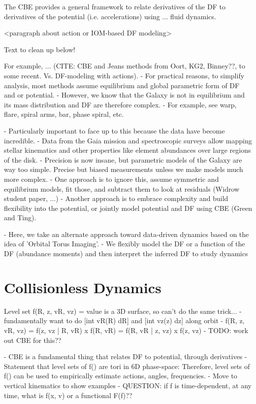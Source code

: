 The CBE provides a general framework to relate derivatives of the DF to derivatives of the potential (i.e. accelerations) using ... fluid dynamics.


<paragraph about action or IOM-based DF modeling>



Text to clean up below!


For example, ... (CITE: CBE and Jeans methods from Oort, KG2, Binney??, to some recent. Vs. DF-modeling with actions).
- For practical reasons, to simplify analysis, most methods assume equilibrium and global parametric form of DF and or potential.
- However, we know that the Galaxy is not in equilibrium and its mass distribution and DF are therefore complex.
- For example, see warp, flare, spiral arms, bar, phase spiral, etc.

- Particularly important to face up to this because the data have become incredible.
- Data from the Gaia mission and spectroscopic surveys allow mapping stellar kinematics and other properties like element abundances over large regions of the disk.
- Precision is now insane, but parametric models of the Galaxy are way too simple. Precise but biased measurements unless we make models much more complex.
- One approach is to ignore this, assume symmetric and equilibrium models, fit those, and subtract them to look at residuals (Widrow student paper, ...)
- Another approach is to embrace complexity and build flexibility into the potential, or jointly model potential and DF using CBE (Green and Ting).

- Here, we take an alternate approach toward data-driven dynamics based on the idea of 'Orbital Torus Imaging'.
- We flexibly model the DF or a function of the DF (abundance moments) and then interpret the inferred DF to study dynamics


\section{Collisionless Dynamics} \label{sec:dynamics}

Level set f(R, z, vR, vz) = value is a 3D surface, so can't do the same trick...
- fundamentally want to do [int vR(R) dR] and [int vz(z) dz] along orbit
- f(R, z, vR, vz) = f(z, vz | R, vR) x f(R, vR) = f(R, vR | z, vz) x f(z, vz)
- TODO: work out CBE for this??

- CBE is a fundamental thing that relates DF to potential, through derivatives
- Statement that level sets of f() are tori in 6D phase-space: Therefore, level sets of f() can be used to empirically estimate actions, angles, frequencies.
- Move to vertical kinematics to show examples
- QUESTION: if f is time-dependent, at any time, what is f(x, v) or a functional F(f)??

